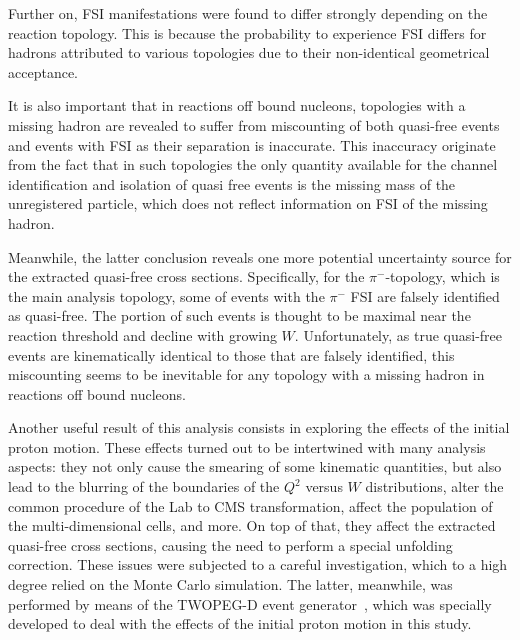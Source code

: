 Further on, FSI manifestations were found to differ strongly depending on the reaction topology. This is because the probability to experience FSI differs for hadrons attributed to various topologies due to their non-identical geometrical acceptance.



It is also important that in reactions off bound nucleons, topologies with a missing hadron are revealed to suffer from miscounting of both quasi-free events and events with FSI as their separation is inaccurate. This inaccuracy originate from the fact that in such topologies the only quantity available for the channel identification and isolation of quasi free events is the missing mass of the unregistered particle, which does not reflect information on FSI of the missing hadron.%



Meanwhile, the latter conclusion reveals one more potential uncertainty source for the extracted quasi-free cross sections. Specifically, for the $\pi^{-}$-topology, which is the main analysis topology, some of events with the $\pi^{-}$ FSI are falsely identified as quasi-free. The portion of such events is thought to be maximal near the reaction threshold and decline with growing $W$. Unfortunately, as true quasi-free events are kinematically identical to those that are falsely identified, this miscounting seems to be inevitable for any topology with a missing hadron in reactions off bound nucleons.


Another useful result of this analysis consists in exploring the effects of the initial proton motion. These effects turned out to be intertwined with many analysis aspects: they not only cause the smearing of some kinematic quantities, but also lead to the blurring of the boundaries of the $Q^{2}$ versus $W$ distributions, alter the common procedure of the Lab to CMS transformation, affect the population of the multi-dimensional cells, and more. On top of that, they affect the extracted quasi-free cross sections, causing the need to perform a special unfolding correction. These issues were subjected to a careful investigation, which to a high degree relied on the Monte Carlo simulation. The latter, meanwhile, was performed by means of the TWOPEG-D event generator~\cite{twopeg-d}, which was specially developed to deal with the effects of the initial proton motion in this study. 





